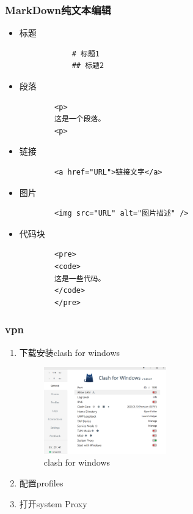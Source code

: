 \documentclass[a4paper,12pt]{article}
\begin{document}
\subsubsection{\color{green}MarkDown纯文本编辑}
\begin{itemize}
    \item 标题
        \begin{verbatim}
            # 标题1
            ## 标题2
        \end{verbatim}
    \item 段落
    \begin{verbatim}
        <p>
        这是一个段落。
        <p>
    \end{verbatim}
    \item 链接
    \begin{verbatim}
        <a href="URL">链接文字</a>
    \end{verbatim}
    \item 图片
    \begin{verbatim}
        <img src="URL" alt="图片描述" />
    \end{verbatim}
    \item 代码块
    \begin{verbatim}
        <pre>
        <code>
        这是一些代码。
        </code>
        </pre>
    \end{verbatim}
\end{itemize}



\subsubsection{\color{green}vpn}
\begin{enumerate}
    \item 下载安装clash for windows
    \begin{figure}[h]
        \includegraphics[width=0.5\textwidth]{vpn.png}
        \caption{clash for windows}      
    \end{figure}
    \item 配置profiles
    \item 打开system Proxy
\end{enumerate}
\end{document}
